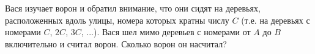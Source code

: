 Вася изучает ворон и обратил внимание, что они сидят на деревьях, расположенных вдоль улицы, номера которых кратны числу $C$ (т.е. на деревьях с номерами $C$, $2C$, $3C$, ...). Вася шел мимо деревьев с номерами от $A$ до $B$ включительно и считал ворон. Сколько ворон он насчитал?